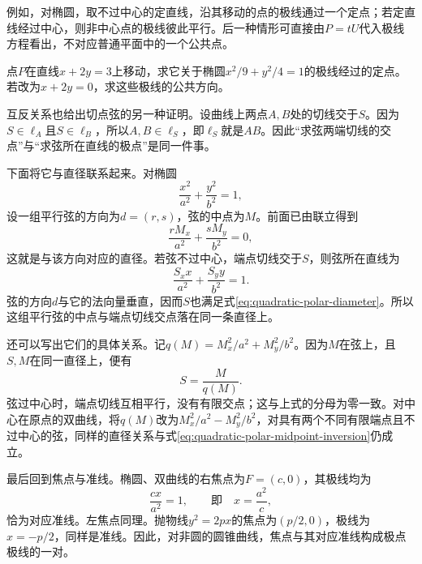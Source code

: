例如，对椭圆，取不过中心的定直线，沿其移动的点的极线通过一个定点；若定直线经过中心，则非中心点的极线彼此平行。后一种情形可直接由\(P=tU\)代入极线方程看出，不对应普通平面中的一个公共点。

\par\noindent\begin{minipage}{\linewidth}
\begin{example}
点\(P\)在直线\(x+2y=3\)上移动，求它关于椭圆\(x^2/9+y^2/4=1\)的极线经过的定点。若改为\(x+2y=0\)，求这些极线的公共方向。
\end{example}
\end{minipage}\par

互反关系也给出切点弦的另一种证明。设曲线上两点\(A,B\)处的切线交于\(S\)。因为\(S\in\ell_A\)且\(S\in\ell_B\)，所以\(A,B\in\ell_S\)，即\(\ell_S\)就是\(AB\)。因此“求弦两端切线的交点”与“求弦所在直线的极点”是同一件事。

下面将它与直径联系起来。对椭圆
\begin{equation*}
 \frac{x^2}{a^2}+\frac{y^2}{b^2}=1,
\end{equation*}
设一组平行弦的方向为\(d=(r,s)\)，弦的中点为\(M\)。前面已由联立得到
\begin{equation}\label{eq:quadratic-polar-diameter}
 \frac{rM_x}{a^2}+\frac{sM_y}{b^2}=0,
\end{equation}
这就是与该方向对应的直径。若弦不过中心，端点切线交于\(S\)，则弦所在直线为
\begin{equation*}
 \frac{S_xx}{a^2}+\frac{S_yy}{b^2}=1.
\end{equation*}
弦的方向\(d\)与它的法向量垂直，因而\(S\)也满足式\eqref{eq:quadratic-polar-diameter}。所以这组平行弦的中点与端点切线交点落在同一条直径上。

还可以写出它们的具体关系。记\(q(M)=M_x^2/a^2+M_y^2/b^2\)。因为\(M\)在弦上，且\(S,M\)在同一直径上，便有
\begin{equation}\label{eq:quadratic-polar-midpoint-inversion}
 S=\frac{M}{q(M)}.
\end{equation}
弦过中心时，端点切线互相平行，没有有限交点；这与上式的分母为零一致。对中心在原点的双曲线，将\(q(M)\)改为\(M_x^2/a^2-M_y^2/b^2\)，对具有两个不同有限端点且不过中心的弦，同样的直径关系与式\eqref{eq:quadratic-polar-midpoint-inversion}仍成立。

最后回到焦点与准线。椭圆、双曲线的右焦点为\(F=(c,0)\)，其极线均为
\begin{equation*}
 \frac{cx}{a^2}=1,\qquad\text{即}\quad x=\frac{a^2}{c},
\end{equation*}
恰为对应准线。左焦点同理。抛物线\(y^2=2px\)的焦点为\((p/2,0)\)，极线为\(x=-p/2\)，同样是准线。因此，对非圆的圆锥曲线，焦点与其对应准线构成极点极线的一对。

